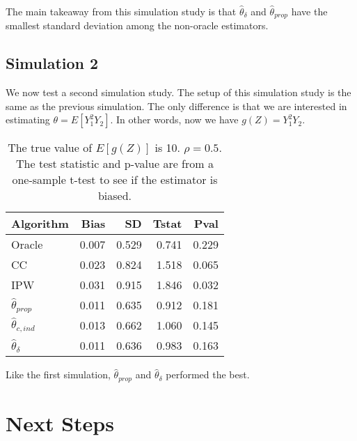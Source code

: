 \documentclass[12pt]{article}
\begin{document}
The main takeaway from this simulation study is that $\hat \theta_\delta$
and $\hat\theta_{prop}$ have the smallest standard deviation among the 
non-oracle estimators.

\subsection*{Simulation 2}
We now test a second simulation study. The setup of this simulation study 
is the same as the previous simulation. The only difference is that we 
are interested in estimating $\theta = E[Y_1^2 Y_2]$. In other words, now 
we have $g(Z) = Y_1^2 Y_2$.

\begin{table}[ht!]
  \caption{The true value of $E[g(Z)]$ is 10. $\rho = 0.5$. The test statistic and 
p-value are from a one-sample t-test to see if the estimator is biased.}
\centering
\begin{tabular}[t]{lrrrr}
\toprule
Algorithm & Bias & SD & Tstat & Pval\\
\midrule
Oracle & 0.007 & 0.529 & 0.741 & 0.229\\
CC & 0.023 & 0.824 & 1.518 & 0.065\\
IPW & 0.031 & 0.915 & 1.846 & 0.032\\
$\hat \theta_{prop}$ & 0.011 & 0.635 & 0.912 & 0.181\\
$\hat \theta_{c, ind}$ & 0.013 & 0.662 & 1.060 & 0.145\\
$\hat \theta_{\delta}$ & 0.011 & 0.636 & 0.983 & 0.163\\
\bottomrule
\end{tabular}
\end{table}

Like the first simulation, $\hat \theta_{prop}$ and $\hat \theta_{\delta}$ 
performed the best.

\newpage 

\section*{Next Steps}
\end{document}
